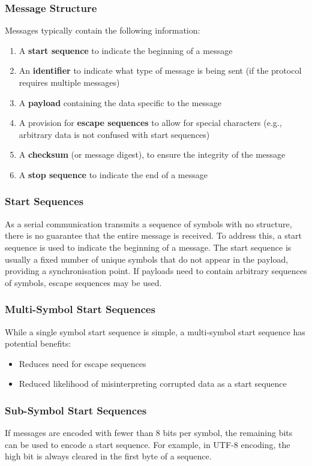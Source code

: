 \documentclass{article}
\begin{document}
\subsubsection{Message Structure}
Messages typically contain the following information:
\begin{enumerate}
    \item A \textbf{start sequence} to indicate the beginning of a
          message
    \item An \textbf{identifier} to indicate what type of message is
          being sent (if the protocol requires multiple messages)
    \item A \textbf{payload} containing the data specific to the
          message
    \item A provision for \textbf{escape sequences} to allow for
          special characters (e.g., arbitrary data is not confused with
          start sequences)
    \item A \textbf{checksum} (or message digest), to ensure the
          integrity of the message
    \item A \textbf{stop sequence} to indicate the end of a message
\end{enumerate}
\subsubsection{Start Sequences}
As a serial communication transmits a sequence of symbols with no
structure, there is no guarantee that the entire message is received.
To address this, a start sequence is used to indicate the beginning of
a message. The start sequence is usually a fixed number of unique
symbols that do not appear in the payload, providing a synchronisation
point. If payloads need to contain arbitrary sequences of symbols,
escape sequences may be used.
\subsubsection{Multi-Symbol Start Sequences}
While a single symbol start sequence is simple, a multi-symbol start
sequence has potential benefits:
\begin{itemize}
    \item Reduces need for escape sequences
    \item Reduced likelihood of misinterpreting corrupted data as a
          start sequence
\end{itemize}
\subsubsection{Sub-Symbol Start Sequences}
If messages are encoded with fewer than 8 bits per symbol, the
remaining bits can be used to encode a start sequence. For example, in
UTF-8 encoding, the high bit is always cleared in the first byte of a
sequence.
\end{document}
